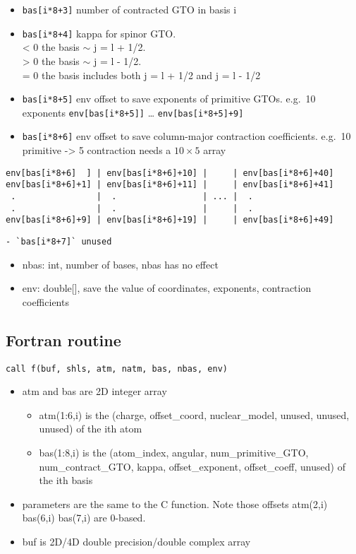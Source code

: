 \documentclass{article}
\begin{document}
\begin{itemize}
\begin{itemize}
  \item
    \verb!bas[i*8+3]! number of contracted GTO in basis i
  \item
    \verb!bas[i*8+4]! kappa for spinor GTO.\\ \textless{} 0 the basis
    \ensuremath{\sim} j = l + 1/2.\\ \textgreater{} 0 the basis
    \ensuremath{\sim} j = l - 1/2.\\ = 0 the basis includes both j = l
    + 1/2 and j = l - 1/2
  \item
    \verb!bas[i*8+5]! env offset to save exponents of primitive GTOs.
    e.g.~10 exponents \verb!env[bas[i*8+5]]! \ldots{}
    \verb!env[bas[i*8+5]+9]!
  \item
    \verb!bas[i*8+6]! env offset to save column-major contraction
    coefficients. e.g.~10 primitive -\textgreater{} 5 contraction needs
    a $10\times 5$ array
  \end{itemize}
\end{itemize}
\begin{verbatim}
env[bas[i*8+6]  ] | env[bas[i*8+6]+10] |     | env[bas[i*8+6]+40]
env[bas[i*8+6]+1] | env[bas[i*8+6]+11] |     | env[bas[i*8+6]+41]
 .                |  .                 | ... |  .                
 .                |  .                 |     |  .                
env[bas[i*8+6]+9] | env[bas[i*8+6]+19] |     | env[bas[i*8+6]+49]
\end{verbatim}
\begin{verbatim}
- `bas[i*8+7]` unused
\end{verbatim}
\begin{itemize}
\item
  nbas: int, number of bases, nbas has no effect
\item
  env: double[], save the value of coordinates, exponents,
  contraction coefficients
\end{itemize}
\subsection{Fortran routine}

\begin{verbatim}
call f(buf, shls, atm, natm, bas, nbas, env)
\end{verbatim}
\begin{itemize}
\item
  atm and bas are 2D integer array
  \begin{itemize}
  \item
    atm(1:6,i) is the (charge, offset\_coord, nuclear\_model, unused,
    unused, unused) of the ith atom
  \item
    bas(1:8,i) is the (atom\_index, angular, num\_primitive\_GTO,
    num\_contract\_GTO, kappa, offset\_exponent, offset\_coeff, unused)
    of the ith basis
  \end{itemize}
\item
  parameters are the same to the C function. Note those offsets
  atm(2,i) bas(6,i) bas(7,i) are 0-based.
\item
  buf is 2D/4D double precision/double complex array
\end{itemize}
\end{document}
